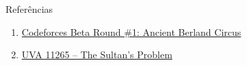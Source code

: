 \begin{frame}[fragile]{Referências}

    \begin{enumerate}
        \item \href{https://codeforces.com/problemset/problem/1/C}{Codeforces Beta Round \#1:
            Ancient Berland Circus}

        \item \href{https://uva.onlinejudge.org/index.php?option=com\_onlinejudge&Itemid=8&page=show\_problem&category=24&problem=2232&mosmsg=Submission+received+with+ID+17859560}{UVA 11265 -- The Sultan's Problem}

    \end{enumerate}

\end{frame}
